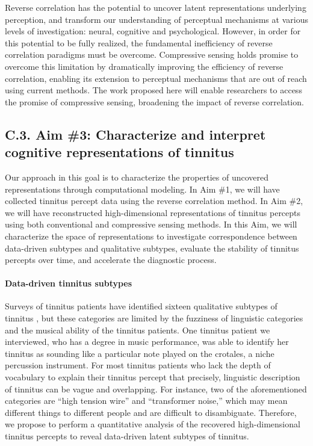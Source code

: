 \documentclass[11pt, notitlepage]{article} %
\begin{document}
Reverse correlation has the potential to uncover latent representations underlying perception, and
transform our understanding of perceptual mechanisms at various levels of investigation: neural, cognitive
and psychological. However, in order for this potential to be fully realized, the fundamental inefficiency of
reverse correlation paradigms must be overcome. Compressive sensing holds promise to overcome this
limitation by dramatically improving the efficiency of reverse correlation, enabling its extension to
perceptual mechanisms that are out of reach using current methods. The work proposed here will enable
researchers to access the promise of compressive sensing, broadening the impact of reverse correlation.

\subsection*{C.3. Aim \#3: Characterize and interpret cognitive representations of tinnitus}

Our approach in this goal is to characterize the properties of uncovered representations
through computational modeling.
In Aim \#1, we will have collected tinnitus percept data using the reverse correlation method.
In Aim \#2, we will have reconstructed high-dimensional representations of tinnitus percepts
using both conventional and compressive sensing methods.
In this Aim, we will characterize the space of representations
to investigate correspondence between data-driven subtypes and qualitative subtypes,
evaluate the stability of tinnitus percepts over time,
and accelerate the diagnostic process.

\paragraph{Data-driven tinnitus subtypes}

Surveys of tinnitus patients have identified sixteen qualitative subtypes of tinnitus
\cite{vajsakovicPrinciplesMethodsPsychoacoustic2021,meikleTinnitusArchiveArchive2004,stoufferCharacterizationTinnitusTinnitus1990},
but these categories are limited by the fuzziness of linguistic categories and the musical ability of the tinnitus patients.
One tinnitus patient we interviewed, who has a degree in music performance,
was able to identify her tinnitus as sounding like a particular note played on the crotales,
a niche percussion instrument.
For most tinnitus patients who lack the depth of vocabulary to explain their tinnitus percept that precisely,
linguistic description of tinnitus can be vague and overlapping.
For instance, two of the aforementioned categories are ``high tension wire'' and ``transformer noise,''
which may mean different things to different people and are difficult to disambiguate.
Therefore, we propose to perform a quantitative analysis of the recovered high-dimensional tinnitus percepts
to reveal data-driven latent subtypes of tinnitus.
\end{document}
